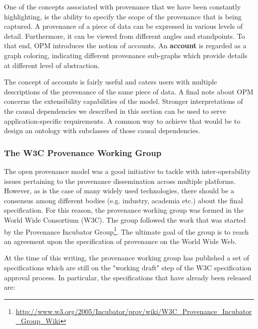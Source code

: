 One of the concepts associated with provenance that we have been constantly highlighting, is the ability to specify the scope of the provenance that is being captured.  A provenance of a piece of data can be expressed in various levels of detail. Furthermore, it can be viewed from different angles and standpoints. To that end, OPM introduces the notion of accounts. An \textbf{account} is regarded as a graph coloring, indicating different provenance sub-graphs which provide details at different level of abstraction.


The concept of accounts is fairly useful and caters users with multiple descriptions of the provenance of the same piece of data.
A final note about OPM concerns the extensibility capabilities of the model. Stronger interpretations of the causal dependencies we described in this section can be used to serve application-specific requirements. A common way to achieve that would be to design an ontology with subclasses of those causal dependencies.


\subsubsection{The W3C Provenance Working Group}
The open provenance model was a good initiative to tackle with inter-operability issues pertaining to the provenance dissemination across multiple platforms. However, as is the case of many widely used technologies, there should be a consensus among different bodies (e.g. industry, academia etc.) about the final specification. For this reason, the provenance working group was formed in the World Wide Consortium (W3C). The group followed the work that was started by the Provenance Incubator Group\footnote{\url{http://www.w3.org/2005/Incubator/prov/wiki/W3C_Provenance_Incubator_Group_Wiki}}. The ultimate goal of the group is to reach an agreement upon the specification of provenance on the World Wide Web.

At the time of this writing, the provenance working group has published a set of specifications which are still on the "working draft" step of the W3C specification approval process. In particular, the specifications that have already been released are:

